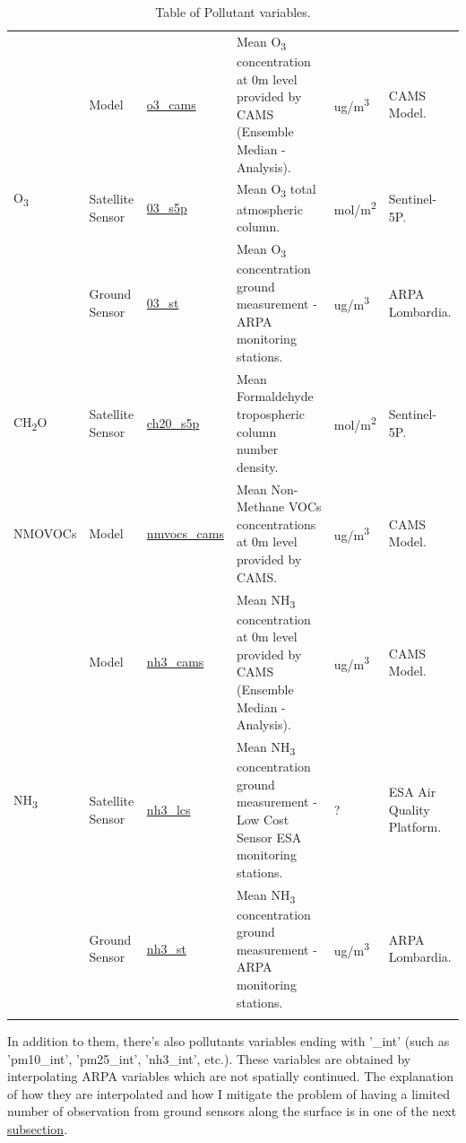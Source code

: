\begin{center}
\begin{longtable}{ |p{2cm}|p{1.5cm}|p{2.3cm}|p{4cm}|p{1cm}|p{2cm}| }
\multirow{3}{4em}{O\textsubscript{3}} & Model  & \underline{o3\_cams} & Mean O\textsubscript{3} concentration at 0m level provided by CAMS  (Ensemble Median - Analysis).\par & ug/m\textsuperscript{3} & CAMS Model.\\ 
& Satellite \newline Sensor  & \underline{03\_s5p} &  Mean O\textsubscript{3} total atmospheric column.\par  & mol/m\textsuperscript{2} & Sentinel-5P.\\ 
& Ground \newline Sensor & \underline{03\_st} &  Mean O\textsubscript{3} concentration ground measurement - ARPA monitoring stations.  \par& ug/m\textsuperscript{3} & ARPA \newline Lombardia.\\ 
 \hline
 
 \multirow{1}{4em}{CH\textsubscript{2}O}& Satellite \newline Sensor  & \underline{ch20\_s5p} &  Mean Formaldehyde tropospheric column number density. \par & mol/m\textsuperscript{2} & Sentinel-5P.\\ \hline
 
\multirow{1}{4em}{NMOVOCs}& Model  & \underline{nmvocs\_cams} & Mean Non-Methane VOCs concentrations at 0m level provided by CAMS.\par & ug/m\textsuperscript{3} & CAMS Model.\\ \hline

\multirow{3}{4em}{NH\textsubscript{3}} & Model  & \underline{nh3\_cams} & Mean NH\textsubscript{3} concentration at 0m level provided by CAMS  (Ensemble Median - Analysis).\par & ug/m\textsuperscript{3} & CAMS Model.\\ 
& Satellite \newline Sensor  & \underline{nh3\_lcs} &  Mean NH\textsubscript{3} concentration ground measurement - Low Cost Sensor ESA monitoring stations. \par  & ? & ESA Air Quality Platform.\\ 
& Ground \newline Sensor & \underline{nh3\_st} &  Mean NH\textsubscript{3} concentration ground measurement - ARPA monitoring stations. \par & ug/m\textsuperscript{3} & ARPA \newline Lombardia.\\ \hline
\caption{Table of Pollutant variables.}
\end{longtable}
\end{center}
In addition to them, there's also pollutants variables ending with '\_int' (such as 'pm10\_int', 'pm25\_int', 'nh3\_int', etc.). These variables are obtained by interpolating ARPA variables which are not spatially continued. The explanation of how they are interpolated and how I mitigate the problem of having a limited number of observation from ground sensors along the surface is in one of the next \hyperref[subsec:nan]{subsection}.
